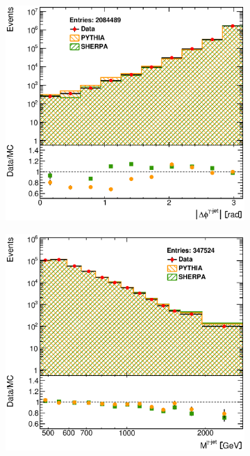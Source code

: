 \documentclass[12pt, twoside]{article}
\numberwithin{equation}{section}
\numberwithin{figure}{section}
\newenvironment{changemargin}[2]{%
\begin{list}{}{%
\setlength{\topsep}{0pt}%
\setlength{\leftmargin}{#1}%
\setlength{\rightmargin}{#2}%
\setlength{\listparindent}{\parindent}%
\setlength{\itemindent}{\parindent}%
\setlength{\parsep}{\parskip}%
}%
\item[]}{\end{list}}
\begin{document}
\begin{figure}
\begin{changemargin}{-1.0cm}{-0.75cm}
\begin{changemargin}{-0.75cm}{-1.0cm}
        \vspace{0.2cm}
        \begin{subfigure}[b]{0.37\textwidth}
            \includegraphics[width=\textwidth]{./images/Results(Default)/DEF-107.eps}
            \subcaption{}
            \label{fig:DefaultDeltaPhiPhotonJet}
        \end{subfigure}
        \begin{subfigure}[b]{0.37\textwidth}
            \includegraphics[width=\textwidth]{./images/Results(Default)/DEF-108.eps}

\end{subfigure}
\end{changemargin}
\end{changemargin}
\end{figure}
\end{document}
